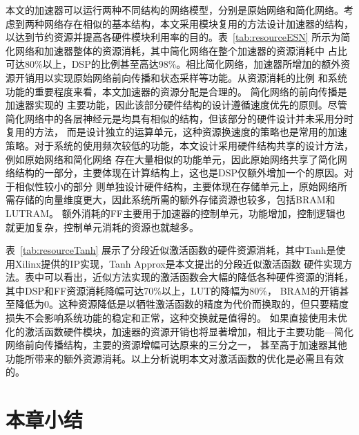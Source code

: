 本文的加速器可以运行两种不同结构的网络模型，分别是原始网络和简化网络。考虑到两种网络存在相似的基本结构，本文采用模块复用的方法设计加速器的结构，
以达到节约资源并提高各硬件模块利用率的目的。表~\ref{tab:resourceESN} 所示为简化网络和加速器整体的资源消耗，其中简化网络在整个加速器的资源消耗中
占比可达80\%以上，DSP的比例甚至高达98\%。相比简化网络，加速器所增加的额外资源开销用以实现原始网络前向传播和状态采样等功能。从资源消耗的比例
和系统功能的重要程度来看，本文加速器的资源分配是合理的。
简化网络的前向传播是加速器实现的
主要功能，因此该部分硬件结构的设计遵循速度优先的原则。尽管简化网络中的各层神经元是均具有相似的结构，但该部分的硬件设计并未采用分时复用的方法，
而是设计独立的运算单元，这种资源换速度的策略也是常用的加速策略。对于系统的使用频次较低的功能，本文设计采用硬件结构共享的设计方法，例如原始网络和简化网络
存在大量相似的功能单元，因此原始网络共享了简化网络结构的一部分，主要体现在计算结构上，这也是DSP仅额外增加一个的原因。对于相似性较小的部分
则单独设计硬件结构，主要体现在存储单元上，原始网络所需存储的向量维度更大，因此系统所需的额外存储资源也较多，包括BRAM和LUTRAM。
额外消耗的FF主要用于加速器的控制单元，功能增加，控制逻辑也就更加复杂，控制单元消耗的资源也就越多。


表~\ref{tab:resourceTanh} 展示了分段近似激活函数的硬件资源消耗，其中Tanh是使用Xilinx提供的IP实现，Tanh Approx是本文提出的分段近似激活函数
硬件实现方法。表中可以看出，近似方法实现的激活函数会大幅的降低各种硬件资源的消耗，其中DSP和FF资源消耗降幅可达70\%以上，LUT的降幅为80\%，
BRAM的开销甚至降低为0。这种资源降低是以牺牲激活函数的精度为代价而换取的，但只要精度损失不会影响系统功能的稳定和正常，这种交换就是值得的。
如果直接使用未优化的激活函数硬件模块，加速器的资源开销也将显著增加，相比于主要功能---简化网络前向传播结构，主要的资源增幅可达原来的三分之一，
甚至高于加速器其他功能所带来的额外资源消耗。以上分析说明本文对激活函数的优化是必需且有效的。


\section{本章小结}

